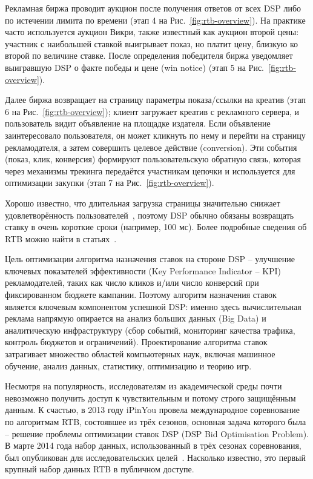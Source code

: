 Рекламная биржа проводит аукцион после получения ответов от всех DSP либо по истечении лимита по времени (этап 4 на Рис.~\ref{fig:rtb-overview}). На практике часто используется аукцион Викри, также известный как аукцион второй цены: участник с наибольшей ставкой выигрывает показ, но платит цену, близкую ко второй по величине ставке. После определения победителя биржа уведомляет выигравшую DSP о факте победы и цене (win notice) (этап 5 на Рис.~\ref{fig:rtb-overview}).

Далее биржа возвращает на страницу параметры показа/ссылки на креатив (этап 6 на Рис.~\ref{fig:rtb-overview}); клиент загружает креатив с рекламного сервера, и пользователь видит объявление на площадке издателя. Если объявление заинтересовало пользователя, он может кликнуть по нему и перейти на страницу рекламодателя, а затем совершить целевое действие (conversion). Эти события (показ, клик, конверсия) формируют пользовательскую обратную связь, которая через механизмы трекинга передаётся участникам цепочки и используется для оптимизации закупки (этап 7 на Рис.~\ref{fig:rtb-overview}).

Хорошо известно, что длительная загрузка страницы значительно снижает удовлетворённость пользователей~\cite{need-web-speed}, поэтому DSP обычно обязаны возвращать ставку в очень короткие сроки (например, 100 мс).
Более подробные сведения об RTB можно найти в статьях~\cite{arrival-of-rtb, rtb-research}.

Цель оптимизации алгоритма назначения ставок на стороне DSP -- улучшение ключевых показателей эффективности (Key Performance Indicator -- KPI) рекламодателей, таких как число кликов и/или число конверсий при фиксированном бюджете кампании. Поэтому алгоритм назначения ставок является ключевым компонентом успешной DSP: именно здесь вычислительная реклама напрямую опирается на анализ больших данных (Big Data) и аналитическую инфраструктуру (сбор событий, мониторинг качества трафика, контроль бюджетов и ограничений). Проектирование алгоритма ставок затрагивает множество областей компьютерных наук, включая машинное обучение, анализ данных, статистику, оптимизацию и теорию игр.

Несмотря на популярность, исследователям из академической среды почти невозможно получить доступ к чувствительным и потому строго защищённым данным. К счастью, в 2013 году iPinYou провела международное соревнование по алгоритмам RTB, состоявшее из трёх сезонов, основная задача которого была -- решение проблемы оптимизации ставок DSP (DSP Bid Optimisation Problem). В марте 2014 года набор данных, использованный в трёх сезонах соревнования, был опубликован для исследовательских целей~\cite{ipinyou-contest-database}. Насколько известно, это первый крупный набор данных RTB в публичном доступе. 

